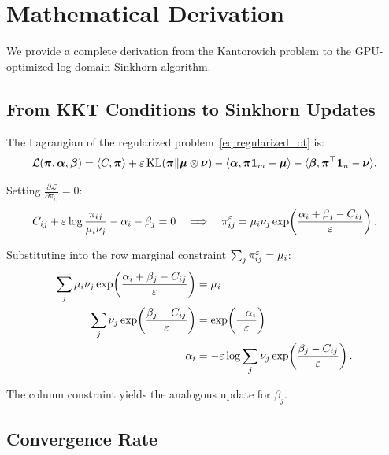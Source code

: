 
\section{Mathematical Derivation}
\label{app:derivation}

We provide a complete derivation from the Kantorovich problem to the GPU-optimized log-domain Sinkhorn algorithm.

\subsection{From KKT Conditions to Sinkhorn Updates}

The Lagrangian of the regularized problem~\eqref{eq:regularized_ot} is:
\begin{equation}
    \mathcal{L}(\bm{\pi}, \bm{\alpha}, \bm{\beta}) = \langle C, \bm{\pi} \rangle + \varepsilon \, \mathrm{KL}(\bm{\pi} \| \bm{\mu} \otimes \bm{\nu}) - \langle \bm{\alpha}, \bm{\pi} \mathbf{1}_m - \bm{\mu} \rangle - \langle \bm{\beta}, \bm{\pi}^\top \mathbf{1}_n - \bm{\nu} \rangle.
\end{equation}

Setting $\frac{\partial \mathcal{L}}{\partial \pi_{ij}} = 0$:
\begin{equation}
    C_{ij} + \varepsilon \log \frac{\pi_{ij}}{\mu_i \nu_j} - \alpha_i - \beta_j = 0 \quad \Longrightarrow \quad \pi_{ij}^\varepsilon = \mu_i \nu_j \exp\!\left(\frac{\alpha_i + \beta_j - C_{ij}}{\varepsilon}\right).
\end{equation}

Substituting into the row marginal constraint $\sum_j \pi_{ij}^\varepsilon = \mu_i$:
\begin{align}
    \sum_j \mu_i \nu_j \exp\!\left(\frac{\alpha_i + \beta_j - C_{ij}}{\varepsilon}\right) &= \mu_i \\
    \sum_j \nu_j \exp\!\left(\frac{\beta_j - C_{ij}}{\varepsilon}\right) &= \exp\!\left(\frac{-\alpha_i}{\varepsilon}\right) \\
    \alpha_i &= -\varepsilon \log \sum_j \nu_j \exp\!\left(\frac{\beta_j - C_{ij}}{\varepsilon}\right).
\end{align}

The column constraint yields the analogous update for $\beta_j$.

\subsection{Convergence Rate}

